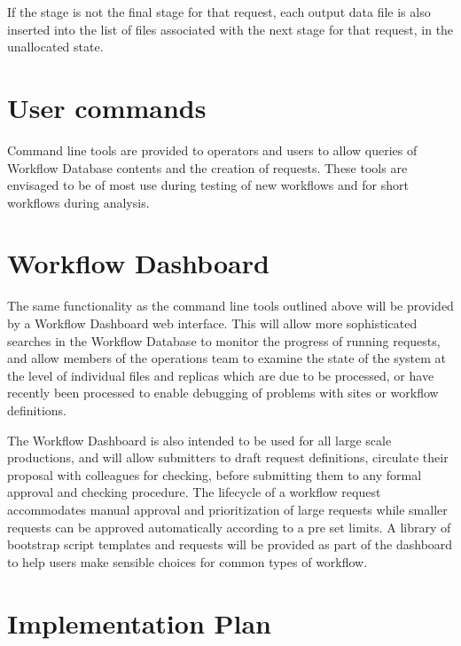 \documentclass[../main-v1.tex]{subfiles}
\begin{document}
If the stage is not the final stage for that request, each output data file is also inserted into the list of files associated with the next stage for that request, in the unallocated state. 

\section{User commands }
\label{sec:flow:commands}

Command line tools are provided to operators and users to allow queries of Workflow Database contents and the creation of requests. These tools are envisaged to be of most use during testing of new workflows and for short workflows during analysis. 

\section{Workflow Dashboard}
\label{sec:flow:dashboard}

The same functionality as the command line tools outlined above will be provided by a Workflow Dashboard web interface. This will allow more sophisticated searches in the Workflow Database to monitor the progress of running requests, and allow members of the operations team to examine the state of the system at the level of individual files and replicas which are due to be processed, or have recently been processed to enable debugging of problems with sites or workflow definitions.

The Workflow Dashboard is also intended to be used for all large scale productions, and will allow submitters to draft request definitions, circulate their proposal with colleagues for checking, before submitting them to any formal approval and checking procedure. The lifecycle of a workflow request accommodates manual approval and prioritization of large requests while smaller requests can be approved automatically according to a pre set limits. A library of bootstrap script templates and requests will be provided as part of the dashboard to help users make sensible choices for common types of workflow.

\section{Implementation Plan }
\end{document}
